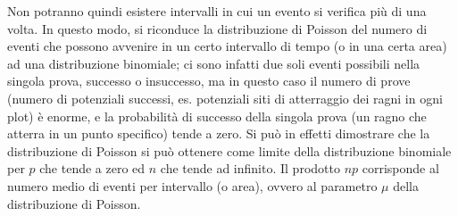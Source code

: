 \documentclass[drafts, 10pt]{book}
\begin{document}
Non potranno quindi esistere intervalli in cui un evento si verifica più di una volta. In questo modo, si riconduce la distribuzione di Poisson del numero di eventi che possono avvenire in un certo intervallo di tempo (o in una certa area) ad una distribuzione binomiale; ci sono infatti due soli eventi possibili nella singola prova, successo o insuccesso, ma in questo caso il numero di prove (numero di potenziali successi, es. potenziali siti di atterraggio dei ragni in ogni plot) è enorme, e la probabilità di successo della singola prova (un ragno che atterra in un punto specifico) tende a zero. Si può in effetti dimostrare che la distribuzione di Poisson si può ottenere come limite della distribuzione binomiale per $p$ che tende a zero ed $n$ che tende ad infinito. Il prodotto $np$ corrisponde al numero medio di eventi per intervallo (o area), ovvero al parametro $\mu$ della distribuzione di Poisson.
\end{document}
